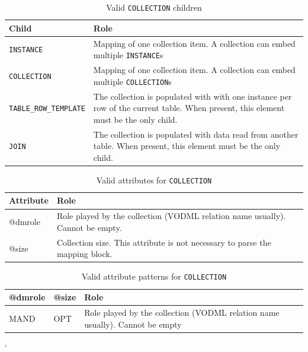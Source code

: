 \documentclass[11pt,a4paper]{ivoa}
\begin{document}
\begin{table}[!htbp]
\small
\centering
\begin{tabulary}{\linewidth}{|L|J|}
       \hline 
           \textbf{Child} &
           \textbf{Role}\\
       \hline  \hline
           \texttt{INSTANCE}    & 
           Mapping of one collection item. A collection can embed multiple \texttt{INSTANCE}s \\              
       \hline  
           \texttt{COLLECTION}    & 
           Mapping of one collection item. A collection can embed multiple \texttt{COLLECTION}s \\              
       \hline  
           \texttt{TABLE\_ROW\_TEMPLATE}    & 
          The collection is populated with with one instance per row of the current table. When present, this element must be the only child. \\       
       \hline  
          \texttt{JOIN}    & 
         The collection is populated with data read from another table. When present, this element must be the only child.\\      
       \hline 
\end{tabulary}
\caption{Valid  \texttt{COLLECTION} children} 
\label{tbl:coll-children}
\end{table}

\begin{table}[!htbp]
\small
\centering
\begin{tabulary}{\linewidth}{|L|J|}
       \hline 
           \textbf{Attribute} & 
           \textbf{Role}\\
       \hline  \hline
          @dmrole    & 
           Role played by the collection (VODML relation name usually). Cannot be empty.\\       
       \hline  
          @size    & 
          Collection size. This attribute is not necessary to parse the mapping block.\\       
       \hline 
 \end{tabulary}
 \caption{Valid attributes for  \texttt{COLLECTION}} 
 \label{tbl:att-att}
 \end{table}


\begin{table}[!t]
\small
\centering
\begin{tabulary}{\linewidth}{|L|L|J|}
    \hline 
        @dmrole   & 
        @size   &  
        Role\\
    \hline  \hline
       MAND & 
       OPT & 
       Role played by the collection (VODML relation name usually). Cannot be empty \\    
    \hline 
  \end{tabulary}
  \caption{Valid attribute patterns for  \texttt{COLLECTION}} 
  \label{tbl:coll-pattern}
 \end{table}`
\FloatBarrier
\end{document}
